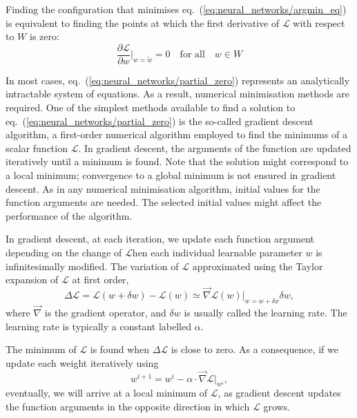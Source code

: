 Finding the configuration that minimises eq.~(\ref{eq:neural_networks/argmin_eq}) is equivalent to finding the
points at which the first derivative of $\mathcal{L}$ with respect to $W$ is zero:
\begin{equation}
    \frac{\partial \mathcal{L}}{\partial w}\bigg|_{w = \tilde{w}} = 0
        \quad \text{for all}\quad w \in W
    \label{eq:neural_networks/partial_zero}
\end{equation}

In most cases, eq.~(\ref{eq:neural_networks/partial_zero}) represents an analytically intractable system of
equations. As a result, numerical minimisation methods are required. One of the simplest methods available to
find a solution to eq.~(\ref{eq:neural_networks/partial_zero}) is the so-called gradient descent algorithm, a
first-order numerical algorithm employed to find the minimums of a scalar function $\mathcal{L}$. In gradient
descent, the arguments of the function are updated iteratively until a minimum is found. Note that the
solution might correspond to a local minimum; convergence to a global minimum is not ensured in gradient
descent. As in any numerical minimisation algorithm, initial values for the function arguments are needed. The
selected initial values might affect the performance of the algorithm.

In gradient descent, at each iteration, we update each function argument depending on the change of
$\mathcal{L}$hen each individual learnable parameter $w$ is infinitesimally modified. The variation of
$\mathcal{L}$ approximated using the Taylor expansion of $\mathcal{L}$ at first order,
\begin{equation}
    \Delta \mathcal{L} = \mathcal{L}(w + \delta w) - \mathcal{L}(w) \simeq
        \vec{\nabla}\mathcal{L}(w)\big|_{w = w + \delta x} \delta w,
    \label{eq:neural_networks/variation}
\end{equation} 
where $\vec{\nabla}$ is the gradient operator, and $\delta w$ is usually called the learning rate. The
learning rate is typically a constant labelled $\alpha$.
  
The minimum of $\mathcal{L}$ is found when $\Delta \mathcal{L}$ is close to zero. As a consequence, if we
update each weight iteratively using
\begin{equation}
    w^{i + 1} = w^{i} - \alpha \cdot \vec{\nabla} \mathcal{L}\big|_{w^{i}},
    \label{eq:neural_networks/gradient_descent}
\end{equation} 
eventually, we will arrive at a local minimum of $\mathcal{L}$, as gradient descent updates the function
arguments in the opposite direction in which $\mathcal{L}$ grows.

